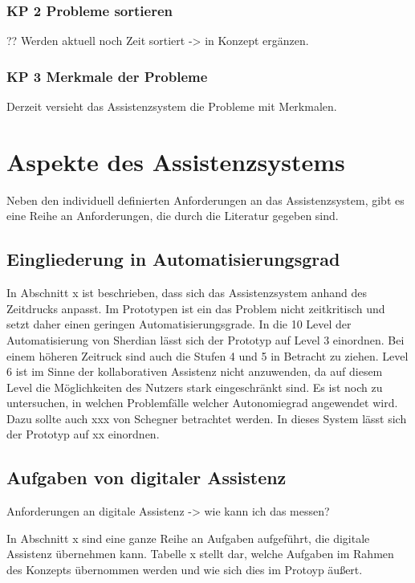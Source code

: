 \subsubsection*{KP 2 Probleme sortieren}
??
Werden aktuell noch Zeit sortiert -> in Konzept ergänzen.

\subsubsection*{KP 3 Merkmale der Probleme}
Derzeit versieht das Assistenzsystem die Probleme mit Merkmalen. 

\section{Aspekte des Assistenzsystems}
Neben den individuell definierten Anforderungen an das Assistenzsystem, gibt es eine Reihe an Anforderungen, die durch die Literatur gegeben sind.

\subsection*{Eingliederung in Automatisierungsgrad}
In Abschnitt x ist beschrieben, dass sich das Assistenzsystem anhand des Zeitdrucks anpasst. Im Prototypen ist ein das Problem nicht zeitkritisch und setzt daher einen geringen Automatisierungsgrade. In die 10 Level der Automatisierung von Sherdian lässt sich der Prototyp auf Level 3 einordnen. Bei einem höheren Zeitruck sind auch die Stufen 4 und 5 in Betracht zu ziehen. Level 6 ist im Sinne der kollaborativen Assistenz nicht anzuwenden, da auf diesem Level die Möglichkeiten des Nutzers stark eingeschränkt sind. Es ist noch zu untersuchen, in welchen Problemfälle welcher Autonomiegrad angewendet wird. Dazu sollte auch xxx von Schegner betrachtet werden. In dieses System lässt sich der Prototyp auf xx einordnen.

\subsection*{Aufgaben von digitaler Assistenz}
Anforderungen an digitale Assistenz -> wie kann ich das messen?

In Abschnitt x sind eine ganze Reihe an Aufgaben aufgeführt, die digitale Assistenz übernehmen kann. Tabelle x stellt dar, welche Aufgaben im Rahmen des Konzepts übernommen werden und wie sich dies im Protoyp äußert.

